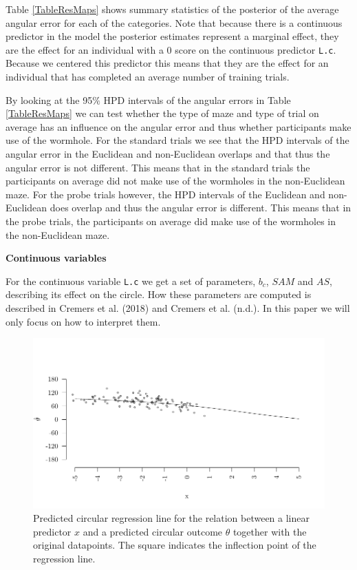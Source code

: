 \documentclass[11pt,]{article}
\begin{document}
Table \ref{TableResMaps} shows summary statistics of the posterior of
the average angular error for each of the categories. Note that because
there is a continuous predictor in the model the posterior estimates
represent a marginal effect, they are the effect for an individual with
a 0 score on the continuous predictor \verb|L.c|. Because we centered
this predictor this means that they are the effect for an individual
that has completed an average number of training trials.

By looking at the 95\(\%\) HPD intervals of the angular errors in Table
\ref{TableResMaps} we can test whether the type of maze and type of
trial on average has an influence on the angular error and thus whether
participants make use of the wormhole. For the standard trials we see
that the HPD intervals of the angular error in the Euclidean and
non-Euclidean overlaps and that thus the angular error is not different.
This means that in the standard trials the participants on average did
not make use of the wormholes in the non-Euclidean maze. For the probe
trials however, the HPD intervals of the Euclidean and non-Euclidean
does overlap and thus the angular error is different. This means that in
the probe trials, the participants on average did make use of the
wormholes in the non-Euclidean maze.

\textbf{Continuous variables}

For the continuous variable \verb|L.c| we get a set of parameters,
\(b_c\), \(SAM\) and \(AS\), describing its effect on the circle. How
these parameters are computed is described in Cremers et al. (2018) and
Cremers et al. (n.d.). In this paper we will only focus on how to
interpret them.

\begin{figure}
\includegraphics{circregline.pdf}
\caption{Predicted circular regression line for the relation between a linear predictor $x$ and a predicted circular outcome $\theta$ together with the original datapoints. The square indicates the inflection point of the regression line.} 
\label{circregline}
\end{figure}
\end{document}
